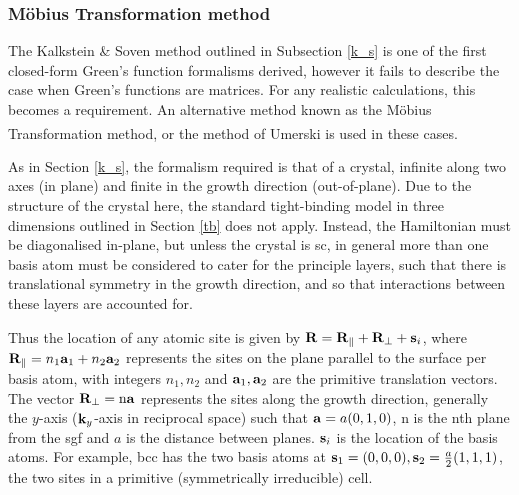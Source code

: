 \documentclass[a4paper, 12pt]{article}
\begin{document}
	\subsubsection{M\"{o}bius Transformation method}
	The Kalkstein \& Soven method outlined in Subsection \ref{k_s} is one of the first closed-form Green's function formalisms derived, however it fails to describe the case when Green's functions are matrices. For any realistic calculations, this becomes a requirement. 
An alternative method known as the M\"{o}bius Transformation method, or the method of Umerski\textcolor{blue}{\textsuperscript{\cite{AU_SGF}}} is used in these cases.
\\\par As in Section \ref{k_s}, the formalism required is that of a crystal, infinite along two axes (in plane) and finite in the growth direction (out-of-plane). Due to the structure of the crystal here, the standard tight-binding model in three dimensions outlined in Section \ref{tb} does not apply.
Instead, the Hamiltonian must be diagonalised in-plane, but unless the crystal is \gls{sc}, in general more than one basis atom must be considered to cater for the principle layers, such that there is translational symmetry in the growth direction, and so that interactions between these layers are accounted for.
\\\par Thus the location of any atomic site is given by ${\bf R} = {\bf R}_\parallel + {\bf R}_\perp +{\bf s}_i$, where ${\bf R}_\parallel = n_1{\bf a}_1+n_2{\bf a}_2$ represents the sites on the plane parallel to the surface per basis atom, with integers $n_1,n_2$ and ${\bf a}_1,{\bf a}_2$ are the primitive translation vectors. The vector ${\bf R}_\perp = \rm n\bf a$ represents the sites along the growth direction, generally the $y$-axis (${\bf k}_y$-axis in reciprocal space) such that ${\bf a} = a(0,1,0)$, n is the nth plane from the \gls{sgf} and $a$ is the distance between planes.
${\bf s}_i$ is the location of the basis atoms. For example, \gls{bcc} has the two basis atoms at ${\bf s}_1 = (0,0,0), 	{\bf s}_2 = \frac{a}{2}(1,1,1)$, the two sites in a primitive (symmetrically irreducible) cell.
	\tikzset{external/export next=false}
\end{document}
